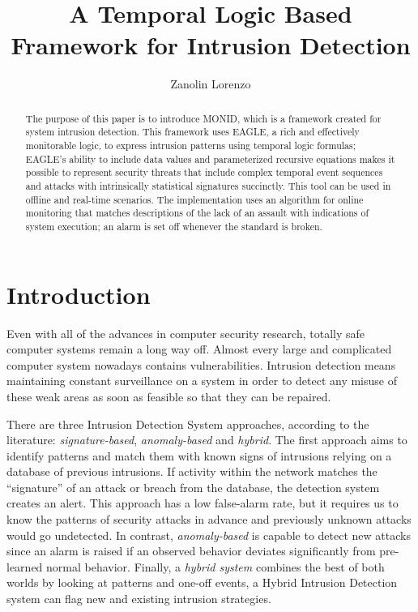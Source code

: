 \documentclass[english]{article}
\title{A Temporal Logic Based Framework for Intrusion Detection}
\author{Zanolin Lorenzo}
\begin{document}
\maketitle

\begin{abstract}
The purpose of this paper is to introduce MONID, which is a framework created for system intrusion detection. This framework uses EAGLE, a rich and effectively monitorable logic, to express intrusion patterns using temporal logic formulas; EAGLE's ability to include data values and parameterized recursive equations makes it possible to represent security threats that include complex temporal event sequences and attacks with intrinsically statistical signatures succinctly. This tool can be used in offline and real-time scenarios. The implementation uses an algorithm for online monitoring that matches descriptions of the lack of an assault with indications of system execution; an alarm is set off whenever the standard is broken.
\end{abstract}

\tableofcontents
\newpage

\section{Introduction}
Even with all of the advances in computer security research, totally safe computer systems remain a long way off. Almost every large and complicated computer system nowadays contains vulnerabilities. Intrusion detection means maintaining constant surveillance on a system in order to detect any misuse of these weak areas as soon as feasible so that they can be repaired.

There are three Intrusion Detection System approaches, according to the literature: \textit{signature-based}\cite{gao2014cyber}, \textit{anomaly-based}\cite{jyothsna2011review} and \textit{hybrid}\cite{garg2016hybrid}. The first approach aims to identify patterns and match them with known signs of intrusions relying on a database of previous intrusions. If activity within the network matches the “signature” of an attack or breach from the database, the detection system creates an alert. This approach has a low false-alarm rate, but it requires us to know the patterns of security attacks in advance and previously unknown attacks would go undetected. In contrast, \textit{anomaly-based} is capable to detect new attacks since an alarm is raised if an observed behavior deviates significantly from pre-learned normal behavior. Finally, a \textit{hybrid system} combines the best of both worlds by looking at patterns and one-off events, a Hybrid Intrusion Detection system can flag new and existing intrusion strategies. 
\end{document}

